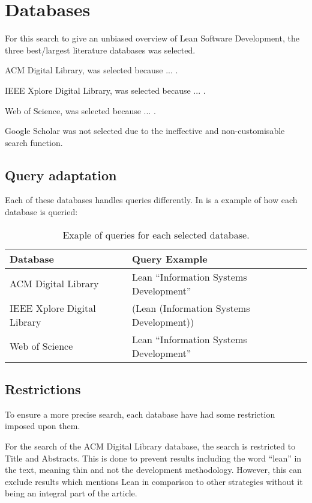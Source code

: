 \section{Databases}
For this search to give an unbiased overview of Lean Software Development, the three best/largest literature databases was selected.

ACM Digital Library, was selected because ... .

IEEE Xplore Digital Library, was selected because ... .

Web of Science, was selected because ... .

Google Scholar was not selected due to the ineffective and non-customisable search function.


\subsection{Query adaptation}
Each of these databases handles queries differently. In  is a example of how each database is queried:
\begin{table}[H]
	\centering
	\begin{tabular}{|l|l|}
		\hline \textbf{Database} & \textbf{Query Example} \\ 
		\hline ACM Digital Library & Lean “Information Systems Development” \\
		\hline IEEE Xplore Digital Library & (Lean (Information Systems Development)) \\ 
		\hline Web of Science & Lean “Information Systems Development” \\ 
		\hline 
	\end{tabular}
	\caption{Exaple of queries for each selected database.}
	\label{tabel:QueryExample}
\end{table}

\subsection{Restrictions}
To ensure a more precise search, each database have had some restriction imposed upon them.

For the search of the ACM Digital Library database, the search is restricted to Title and Abstracts.
This is done to prevent results including the word “lean” in the text, meaning thin and not the development methodology.
However, this can exclude results which mentions Lean in comparison to other strategies without it being an integral part of the article.

